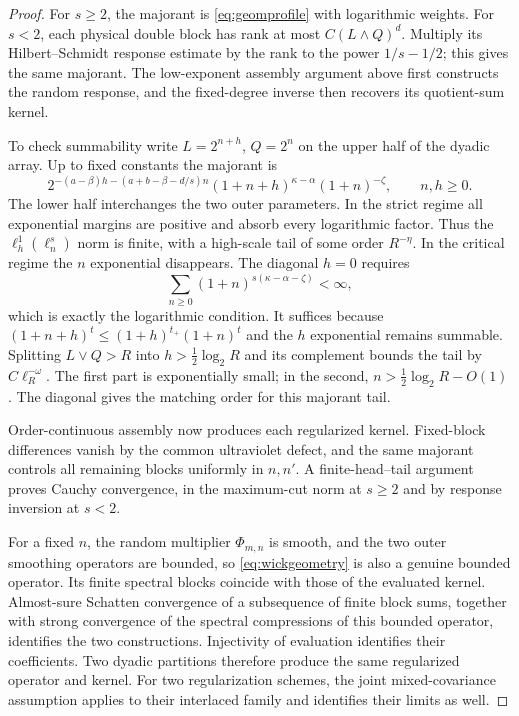 \documentclass[11pt,a4paper]{amsart}
\numberwithin{equation}{section}
\theoremstyle{definition}
\theoremstyle{remark}
\begin{document}
\begin{proof}
For $s\ge2$, the majorant is \eqref{eq:geomprofile} with logarithmic weights. For $s<2$, each physical double block has rank at most $C(L\wedge Q)^d$. Multiply its Hilbert--Schmidt response estimate by the rank to the power $1/s-1/2$; this gives the same majorant. The low-exponent assembly argument above first constructs the random response, and the fixed-degree inverse then recovers its quotient-sum kernel.

To check summability write $L=2^{n+h}$, $Q=2^n$ on the upper half of the dyadic array. Up to fixed constants the majorant is
\begin{equation}\label{eq:gapsum}
 2^{-(a-\beta)h-(a+b-\beta-d/s)n}
 (1+n+h)^{\kappa-\alpha}(1+n)^{-\zeta},\qquad n,h\ge0.
\end{equation}
The lower half interchanges the two outer parameters. In the strict regime all exponential margins are positive and absorb every logarithmic factor. Thus the $\ell^1_h(\ell^s_n)$ norm is finite, with a high-scale tail of some order $R^{-\eta}$. In the critical regime the $n$ exponential disappears. The diagonal $h=0$ requires
\[
 \sum_{n\ge0}(1+n)^{s(\kappa-\alpha-\zeta)}<\infty,
\]
which is exactly the logarithmic condition. It suffices because
$(1+n+h)^t\le(1+h)^{t_+}(1+n)^t$
and the $h$ exponential remains summable. Splitting $L\vee Q>R$ into $h>\frac12\log_2R$ and its complement bounds the tail by $C\ell_R^{-\omega}$. The first part is exponentially small; in the second, $n>\frac12\log_2R-O(1)$. The diagonal gives the matching order for this majorant tail.

Order-continuous assembly now produces each regularized kernel. Fixed-block differences vanish by the common ultraviolet defect, and the same majorant controls all remaining blocks uniformly in $n,n'$. A finite-head--tail argument proves Cauchy convergence, in the maximum-cut norm at $s\ge2$ and by response inversion at $s<2$.

For a fixed $n$, the random multiplier $\Phi_{m,n}$ is smooth, and the two outer smoothing operators are bounded, so \eqref{eq:wickgeometry} is also a genuine bounded operator. Its finite spectral blocks coincide with those of the evaluated kernel. Almost-sure Schatten convergence of a subsequence of finite block sums, together with strong convergence of the spectral compressions of this bounded operator, identifies the two constructions. Injectivity of evaluation identifies their coefficients. Two dyadic partitions therefore produce the same regularized operator and kernel. For two regularization schemes, the joint mixed-covariance assumption applies to their interlaced family and identifies their limits as well.


\end{proof}
\end{document}
